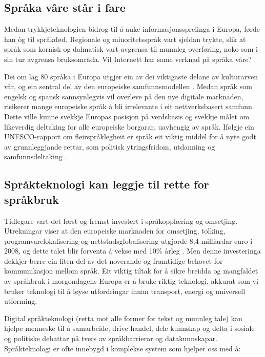 \begin{multicols}{2}
\subsection{Språka våre står i fare}

Medan trykkjeteknologien bidrog til å auke informasjonsspreiinga i Europa, førde han òg til språkdød. Regionale og minoritetsspråk vart sjeldan trykte, slik at språk som kornisk og dalmatisk vart avgrensa til munnleg overføring, noko som i sin tur avgrensa bruksområda. Vil Internett har same verknad på språka våre?


Dei om lag 80 språka i Europa utgjer ein av dei viktigaste delane av kulturarven vår, og ein sentral del av den europeiske samfunnsmodellen \cite{EC2}. Medan språk som engelsk og spansk sannsynlegvis vil overleve på den nye digitale marknaden, risikerer mange europeiske språk å bli irrelevante i eit nettverksbasert samfunn. Dette ville kunne svekkje Europas posisjon på verdsbasis og svekkje målet om likeverdig deltaking for alle europeiske borgarar, uavhengig av språk. Ifølgje ein UNESCO-rapport om fleirspråklegheit er språk eit viktig middel for å nyte godt av grunnleggjande rettar, som politisk ytringsfridom, utdanning og samfunnsdeltaking  \cite{Unesco1}. 

\subsection{Språkteknologi kan leggje til rette for språkbruk}

Tidlegare vart det først og fremst investert i språkopplæring og omsetjing. Utrekningar viser at den europeiske marknaden for omsetjing, tolking, programvarelokalisering og nettstadsglobalisering utgjorde 8,4 milliardar euro i 2008, og dette talet blir forventa å vekse med 10\% årleg \cite{EC3}. Men denne investeringa dekkjer berre ein liten del av det noverande og framtidige behovet for kommunikasjon mellom språk. Eit viktig tiltak for å sikre breidda og mangfaldet av språkbruk i morgondagens Europa er å bruke riktig teknologi, akkurat som vi bruker teknologi til å løyse utfordringar innan transport, energi og universell utforming. 

Digital språkteknologi (retta mot alle former for tekst og munnleg tale) kan hjelpe menneske til å samarbeide, drive handel, dele kunnskap og delta i sosiale og politiske debattar på tvers av språkbarrierar og datakunnskapar. Språkteknologi er ofte innebygd i komplekse system som hjelper oss med å: 


\end{multicols}
